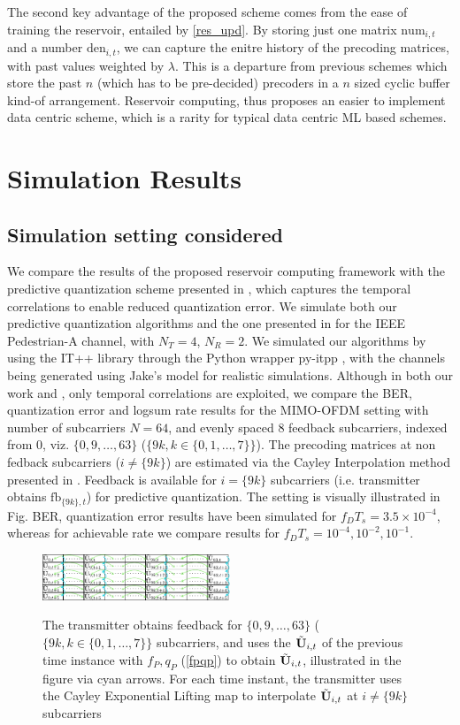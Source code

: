 \documentclass[conference]{IEEEtran}
\begin{document}
The second key advantage of the proposed scheme comes from the ease of training the reservoir, entailed by \eqref{res_upd}.
By storing just one matrix $\text{num}_{i,t}$ and a number $\text{den}_{i,t}$, we can capture the enitre history of the precoding matrices, with past values weighted by $\lambda$.
This is a departure from previous schemes \cite{Gupt1905:Predictive,6891198,6545375} which store the past $n$ (which has to be pre-decided) precoders in a $n$ sized cyclic buffer kind-of arrangement.
Reservoir computing, thus proposes an easier to implement data centric scheme, which is a rarity for typical data centric ML based schemes.


\section{Simulation Results}
\label{section4}
\subsection{Simulation setting considered}
\label{setting}
\noindent We compare the results of the proposed reservoir computing framework with the predictive quantization scheme presented in \cite{6891198}, which captures the temporal correlations to enable reduced quantization error.
We simulate both our predictive quantization algorithms and the one presented in \cite{6891198} for the IEEE Pedestrian-A channel, with $N_T=4$, $N_R=2$. We simulated our algorithms by using the IT++ library through the Python wrapper py-itpp \cite{ViditPy}, with the channels being generated using Jake’s model for realistic simulations. Although in both our work and \cite{6891198}, only temporal correlations are exploited, we compare the BER, quantization error and logsum rate results for the MIMO-OFDM setting with number of subcarriers $N=64$, and evenly spaced $8$ feedback subcarriers, indexed from 0, viz. $\{0,9,\ldots,63\}$ ($\{9k, k \in \{0,1,\ldots,7\}\}$). The precoding matrices at non fedback subcarriers ($i\neq\{9k\}$) are estimated via the Cayley Interpolation method presented in \cite{Gupt1905:Predictive}. Feedback is available for $i=\{9k\}$ subcarriers (i.e. transmitter obtains $\text{fb}_{\{9k\},t}$) for predictive quantization. The setting is visually illustrated in Fig. BER, quantization error results have been simulated for $f_DT_s=3.5\times10^{-4}$, whereas for achievable rate we compare results for $f_DT_s=10^{-4},10^{-2},10^{-1}$. 
\begin{figure}[h]
\centering
\includegraphics[width=0.5\textwidth]{images/table.pdf}
\label{table}
\caption{The transmitter obtains feedback for $\{0,9,\ldots,63\}$ ($\{9k, k \in \{0,1,\ldots,7\}\}$ subcarriers, and uses the $\tilde{{\bf U}}_{i,t}$ of the previous time instance with $f_P,q_P$ (\eqref{fpqp}) to obtain $\tilde{{\bf U}}_{i,t}$, illustrated in the figure via cyan arrows. For each time instant, the transmitter uses the Cayley Exponential Lifting map to interpolate $\tilde{{\bf U}}_{i,t}$ at $i\neq\{9k\}$ subcarriers}
\end{figure}
\newpage
\end{document}
